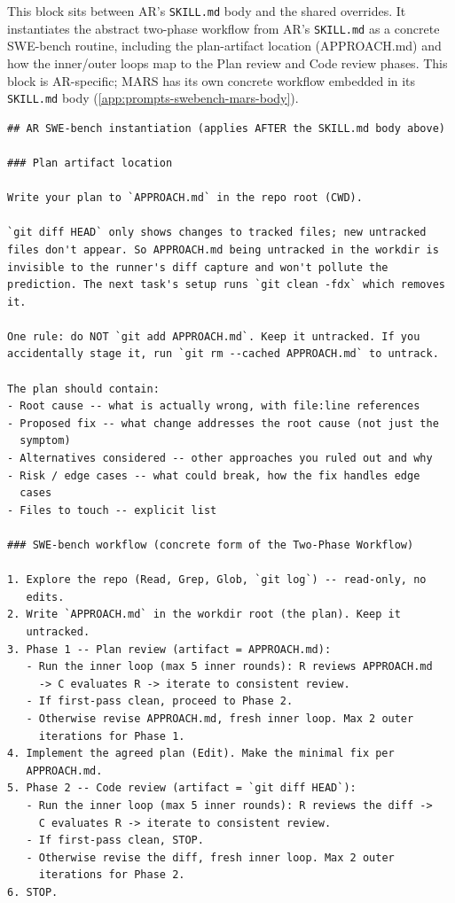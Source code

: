 \documentclass{article}
\begin{document}
This block sits between AR's \texttt{SKILL.md} body and the shared
overrides. It instantiates the abstract two-phase workflow from AR's
\texttt{SKILL.md} as a concrete SWE-bench routine, including the
plan-artifact location (APPROACH.md) and how the inner/outer loops
map to the Plan review and Code review phases. This block is
AR-specific; MARS has its own concrete workflow embedded in its
\texttt{SKILL.md} body (\autoref{app:prompts-swebench-mars-body}).

\begin{footnotesize}
\begin{verbatim}
## AR SWE-bench instantiation (applies AFTER the SKILL.md body above)

### Plan artifact location

Write your plan to `APPROACH.md` in the repo root (CWD).

`git diff HEAD` only shows changes to tracked files; new untracked
files don't appear. So APPROACH.md being untracked in the workdir is
invisible to the runner's diff capture and won't pollute the
prediction. The next task's setup runs `git clean -fdx` which removes
it.

One rule: do NOT `git add APPROACH.md`. Keep it untracked. If you
accidentally stage it, run `git rm --cached APPROACH.md` to untrack.

The plan should contain:
- Root cause -- what is actually wrong, with file:line references
- Proposed fix -- what change addresses the root cause (not just the
  symptom)
- Alternatives considered -- other approaches you ruled out and why
- Risk / edge cases -- what could break, how the fix handles edge
  cases
- Files to touch -- explicit list

### SWE-bench workflow (concrete form of the Two-Phase Workflow)

1. Explore the repo (Read, Grep, Glob, `git log`) -- read-only, no
   edits.
2. Write `APPROACH.md` in the workdir root (the plan). Keep it
   untracked.
3. Phase 1 -- Plan review (artifact = APPROACH.md):
   - Run the inner loop (max 5 inner rounds): R reviews APPROACH.md
     -> C evaluates R -> iterate to consistent review.
   - If first-pass clean, proceed to Phase 2.
   - Otherwise revise APPROACH.md, fresh inner loop. Max 2 outer
     iterations for Phase 1.
4. Implement the agreed plan (Edit). Make the minimal fix per
   APPROACH.md.
5. Phase 2 -- Code review (artifact = `git diff HEAD`):
   - Run the inner loop (max 5 inner rounds): R reviews the diff ->
     C evaluates R -> iterate to consistent review.
   - If first-pass clean, STOP.
   - Otherwise revise the diff, fresh inner loop. Max 2 outer
     iterations for Phase 2.
6. STOP.
\end{verbatim}
\end{footnotesize}
\end{document}
